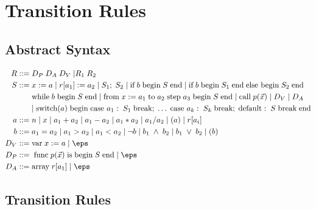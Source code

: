 \chapter{Transition Rules}
\label{app:TransitionRules}

\section{Abstract Syntax}
\begin{align*}
R ::= \; & D_P \; D_A \; D_V \; | R_1 \; R_2 \; \\
S::= \; & x := a \; | \; r[a_1] := a_2 \; | \; S_1; \; S_2 \; | \; \text{if} \; b \; \text{begin} \; S \; \text{end} \; | \; \text{if} \; b \; \text{begin} \; S_1 \; \text{end} \; \text{else begin} \; S_2 \; \text{end} \\
~ & \text{while} \; b \; \text{begin} \; S \; \text{end} \; | \; \text{from} \; x := a_1 \; \text{to} \; a_2 \; \text{step} \; a_3 \; \text{begin} \; S \; \text{end} \; | \; \text{call} \; p(\vec{x}) \; | \; D_V \; | \; D_A \; \\
~ & | \; \text{switch}(a) \; \text{begin} \; \text{case } a_1: \; S_1 \; \text{break}; \; \dots \; \text{case } a_k: \; S_k \; \text{break}; \; \text{default}: \; S \; \text{break} \; \text{end} \\
a::= \; & n \; | \; x \; | \; a_1 + a_2 \; | \; a_1 - a_2 \; | \; a_1 * a_2 \; | \; a_1 / a_2 \; | \; (a) \; | \; r[a_i]\\
b::= \; &a_1 = a_2 \; | \; a_1 > a_2 \; | \; a_1 < a_2 \; | \; \neg b \; | \; b_1 \; \wedge \; b_2 \; | \; b_1 \; \vee \; b_2 \; | \; (b)\\
D_V::= \; & \text{var} \; x := a \;|\; \eps\\
D_P::= \; & \; \text{func} \; p(\vec{x}) \; \text{is} \; \text{begin} \; S \; \text{end}  \;|\; \eps\\
D_A::= \; & \text{array} \; r[a_1]  \;|\; \eps\\
\end{align*}

\section{Transition Rules}

